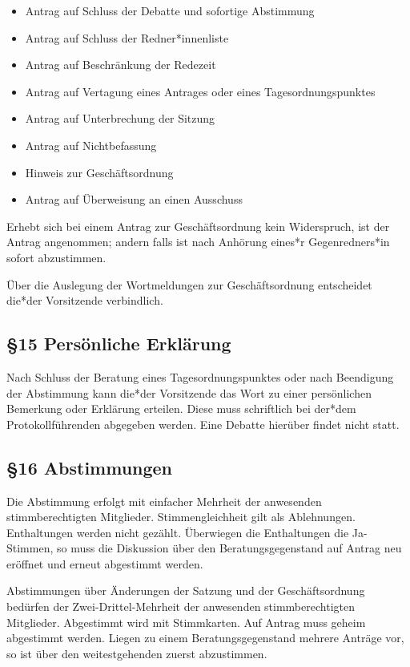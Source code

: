 \documentclass[12pt]{report}
\begin{document}
\begin{flushleft}
\begin{itemize}
  \item Antrag auf Schluss der Debatte und sofortige Abstimmung
  \item Antrag auf Schluss der {\color{red}Redner*innenliste}
  \item Antrag auf Beschränkung der Redezeit
  \item Antrag auf Vertagung eines Antrages oder eines Tagesordnungspunktes
  \item Antrag auf Unterbrechung der Sitzung
  \item Antrag auf Nichtbefassung
  \item Hinweis zur Geschäftsordnung
  \item Antrag auf Überweisung an einen Ausschuss
\end{itemize}

Erhebt sich bei einem Antrag zur Geschäftsordnung kein Widerspruch, ist der Antrag angenommen; andern
falls ist nach Anhörung {\color{red}eines*r Gegenredners*in} sofort abzustimmen.

Über die Auslegung der Wortmeldungen zur Geschäftsordnung entscheidet {\color{red}die*der} Vorsitzende verbindlich.


\subsection*{§15 Persönliche Erklärung}
Nach Schluss der Beratung eines Tagesordnungspunktes oder nach Beendigung der Abstimmung kann {\color{red}die*der}
Vorsitzende das Wort zu einer persönlichen Bemerkung oder Erklärung erteilen. Diese muss schriftlich bei
{\color{red}der*dem} Protokollführenden abgegeben werden. Eine Debatte hierüber findet nicht statt.
\subsection*{§16 Abstimmungen}
Die Abstimmung erfolgt mit einfacher Mehrheit der anwesenden stimmberechtigten Mitglieder.
Stimmengleichheit gilt als Ablehnungen. Enthaltungen werden nicht gezählt. Überwiegen die Enthaltungen die 
Ja-Stimmen, so muss die Diskussion über den Beratungsgegenstand auf Antrag neu eröffnet und erneut
abgestimmt werden.

Abstimmungen über Änderungen der Satzung und der Geschäftsordnung bedürfen der
Zwei-Drittel-Mehrheit der anwesenden stimmberechtigten Mitglieder. Abgestimmt wird mit Stimmkarten.
Auf Antrag muss geheim abgestimmt werden.
Liegen zu einem Beratungsgegenstand mehrere Anträge vor, so ist über den weitestgehenden zuerst abzustimmen.


\end{flushleft}
\end{document}
